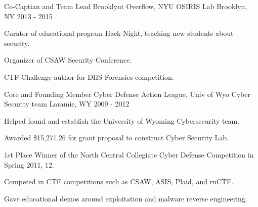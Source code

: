


\begin{cventries}


\cventry
{Co-Captian and Team Lead} %
{Brooklynt Overflow, NYU OSIRIS Lab} %
{Brooklyn, NY} %
{2013 - 2015} %
{ %
\begin{cvitems}
\item {Curator of educational program Hack Night, teaching new students about security.}
\item {Organizer of CSAW Security Conference.}
\item {CTF Challenge author for DHS Forensics competition.}
\end{cvitems}
}


\cventry
{Core and Founding Member} %
{Cyber Defense Action League, Univ of Wyo Cyber Security team} %
{Laramie, WY} %
{2009 - 2012} %
{ %
\begin{cvitems}
\item {Helped found and establish the University of Wyoming Cybersecurity team.}
\item {Awarded \$15,271.26 for grant proposal to construct Cyber Security Lab.}
\item {1st Place Winner of the North Central Collegiate Cyber Defense Competition in Spring 2011, 12.}
\item {Competed in CTF competitions such as CSAW, ASIS, Plaid, and ruCTF.}
\item {Gave educational demos around exploitation and malware reverse engineering.}
\end{cvitems}
}



\end{cventries}
